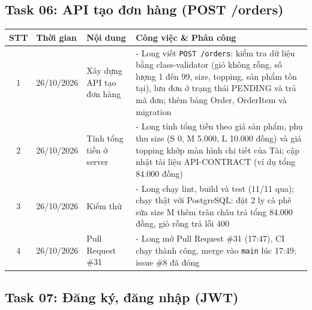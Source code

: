 \documentclass[12pt, a4paper]{article}
\begin{document}
\vspace{0.8cm}


\subsection*{Task 06: API tạo đơn hàng (POST /orders)}

\begin{tabularx}{\textwidth}{|c|p{3.2cm}|Y|Y|}
    \hline
    \textbf{STT} & \textbf{Thời gian} & \textbf{Nội dung} & \textbf{Công việc \& Phân công} \\
    \hline

    1 & 26/10/2026 & Xây dựng API tạo đơn hàng &
    - Long viết \texttt{POST /orders}: kiểm tra dữ liệu bằng class-validator (giỏ không rỗng, số lượng 1 đến 99, size, topping, sản phẩm tồn tại), lưu đơn ở trạng thái PENDING và trả mã đơn; thêm bảng Order, OrderItem và migration \\
    \hline

    2 & 26/10/2026 & Tính tổng tiền ở server &
    - Long tính tổng tiền theo giá sản phẩm, phụ thu size (S 0, M 5.000, L 10.000 đồng) và giá topping khớp màn hình chi tiết của Tài; cập nhật tài liệu API-CONTRACT (ví dụ tổng 84.000 đồng) \\
    \hline

    3 & 26/10/2026 & Kiểm thử &
    - Long chạy lint, build và test (11/11 qua); chạy thật với PostgreSQL: đặt 2 ly cà phê sữa size M thêm trân châu trả tổng 84.000 đồng, giỏ rỗng trả lỗi 400 \\
    \hline

    4 & 26/10/2026 & Pull Request \#31 &
    - Long mở Pull Request \#31 (17:47), CI chạy thành công, merge vào \texttt{main} lúc 17:49; issue \#8 đã đóng \\
    \hline
\end{tabularx}

\vspace{0.8cm}

\subsection*{Task 07: Đăng ký, đăng nhập (JWT)}
\end{document}
